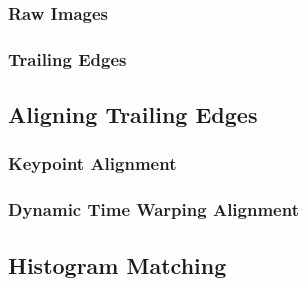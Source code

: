 \subsubsection{Raw Images}

\subsubsection{Trailing Edges}

\subsection{Aligning Trailing Edges}

\subsubsection{Keypoint Alignment}

\subsubsection{Dynamic Time Warping Alignment}

\subsection{Histogram Matching}


